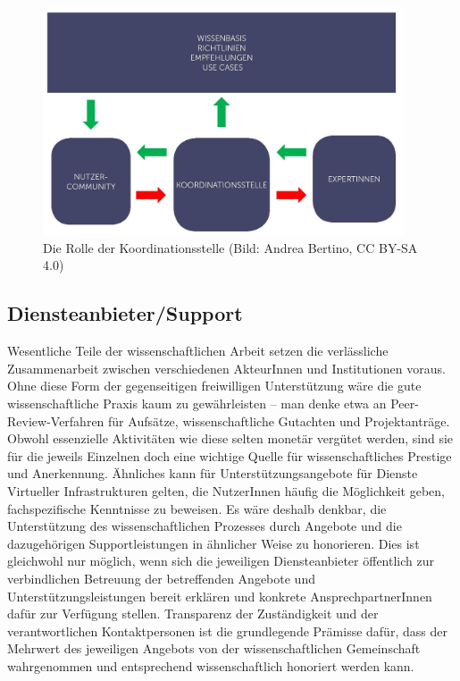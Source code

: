 \documentclass[a4paper,
fontsize=11pt,
oneside,
numbers=noperiodatend,
parskip=half-,
bibliography=totoc,
final
]{scrartcl}
\begin{document}
\begin{figure}
\centering
\includegraphics[width=0.95\textwidth]{img/Koordinationsstelle.jpg}
\caption{Die Rolle der Koordinationsstelle (Bild: Andrea Bertino, CC
BY-SA 4.0)}
\end{figure}

\hypertarget{diensteanbietersupport}{%
\subsection{Diensteanbieter/Support}\label{diensteanbietersupport}}

Wesentliche Teile der wissenschaftlichen Arbeit setzen die verlässliche
Zusammenarbeit zwischen verschiedenen AkteurInnen und Institutionen
voraus. Ohne diese Form der gegenseitigen freiwilligen Unterstützung
wäre die gute wissenschaftliche Praxis kaum zu gewährleisten -- man
denke etwa an Peer-Review-Verfahren für Aufsätze, wissenschaftliche
Gutachten und Projektanträge. Obwohl essenzielle Aktivitäten wie diese
selten monetär vergütet werden, sind sie für die jeweils Einzelnen doch
eine wichtige Quelle für wissenschaftliches Prestige und Anerkennung.
Ähnliches kann für Unterstützungsangebote für Dienste Virtueller
Infrastrukturen gelten, die NutzerInnen häufig die Möglichkeit geben,
fachspezifische Kenntnisse zu beweisen. Es wäre deshalb denkbar, die
Unterstützung des wissenschaftlichen Prozesses durch Angebote und die
dazugehörigen Supportleistungen in ähnlicher Weise zu honorieren. Dies
ist gleichwohl nur möglich, wenn sich die jeweiligen Diensteanbieter
öffentlich zur verbindlichen Betreuung der betreffenden Angebote und
Unterstützungsleistungen bereit erklären und konkrete
AnsprechpartnerInnen dafür zur Verfügung stellen. Transparenz der
Zuständigkeit und der verantwortlichen Kontaktpersonen ist die
grundlegende Prämisse dafür, dass der Mehrwert des jeweiligen Angebots
von der wissenschaftlichen Gemeinschaft wahrgenommen und entsprechend
wissenschaftlich honoriert werden kann.
\end{document}
